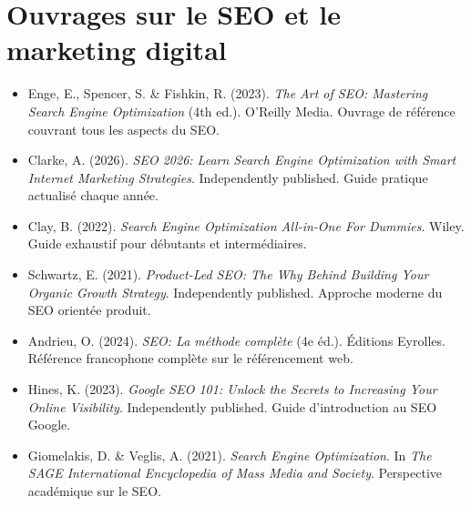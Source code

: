 \documentclass[12pt,a4paper,twoside]{report}
\begin{document}
\section*{Ouvrages sur le SEO et le marketing digital}
\begin{itemize}
    \item Enge, E., Spencer, S. \& Fishkin, R. (2023). \textit{The Art of SEO: Mastering Search Engine Optimization} (4th ed.). O'Reilly Media. Ouvrage de référence couvrant tous les aspects du SEO.
    \item Clarke, A. (2026). \textit{SEO 2026: Learn Search Engine Optimization with Smart Internet Marketing Strategies}. Independently published. Guide pratique actualisé chaque année.
    \item Clay, B. (2022). \textit{Search Engine Optimization All-in-One For Dummies}. Wiley. Guide exhaustif pour débutants et intermédiaires.
    \item Schwartz, E. (2021). \textit{Product-Led SEO: The Why Behind Building Your Organic Growth Strategy}. Independently published. Approche moderne du SEO orientée produit.
    \item Andrieu, O. (2024). \textit{SEO: La méthode complète} (4e éd.). Éditions Eyrolles. Référence francophone complète sur le référencement web.
    \item Hines, K. (2023). \textit{Google SEO 101: Unlock the Secrets to Increasing Your Online Visibility}. Independently published. Guide d'introduction au SEO Google.
    \item Giomelakis, D. \& Veglis, A. (2021). \textit{Search Engine Optimization}. In \textit{The SAGE International Encyclopedia of Mass Media and Society}. Perspective académique sur le SEO.
\end{itemize}
\end{document}

